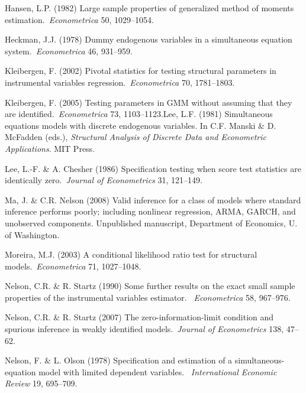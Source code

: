 \documentclass[12pt,thmsb,titlepage,final,oneside,letterpaper]{article}
\begin{document}
\begin{description}
\item Hansen, L.P. (1982) Large sample properties of generalized method of
moments estimation.\ \emph{Econometrica} 50, 1029--1054.

\item Heckman, J.J. (1978) Dummy endogenous variables in a simultaneous
equation system.\ \emph{Econometrica} 46, 931--959.

\item Kleibergen, F. (2002) Pivotal statistics for testing structural
parameters in instrumental variables regression.\ \emph{Econometrica} 70,
1781--1803.

\item Kleibergen, F. (2005) Testing parameters in GMM without assuming that
they are identified.\ \emph{Econometrica} 73, 1103--1123.Lee, L.F. (1981)
Simultaneous equations models with discrete endogenous variables. In C.F.
Manski \& D. McFadden (eds.), \emph{Structural Analysis of Discrete Data and
Econometric Applications}. MIT Press.

\item Lee, L.-F. \& A. Chesher (1986) Specification testing when score test
statistics are identically zero.\ \emph{Journal of Econometrics }31,
121--149.

\item Ma, J. \& C.R. Nelson (2008) Valid inference for a class of models
where standard inference performs poorly; including nonlinear regression,
ARMA, GARCH, and unobserved components. Unpublished manuscript, Department
of Economics, U. of Washington.

\item Moreira, M.J. (2003) A conditional likelihood ratio test for
structural models.\ \emph{Econometrica} 71, 1027--1048.

\item Nelson, C.R. \& R. Startz (1990) Some further results on the exact
small sample properties of the instrumental variables estimator.\ \emph{%
Econometrica} 58, 967--976.

\item Nelson, C.R. \& R. Startz (2007) The zero-information-limit condition
and spurious inference in weakly identified models.\ \emph{Journal of
Econometrics} 138, 47--62.

\item Nelson, F. \& L. Olson (1978) Specification and estimation of a
simultaneous-equation model with limited dependent variables.\ \emph{%
International Economic Review }19, 695--709.


\end{description}
\end{document}
